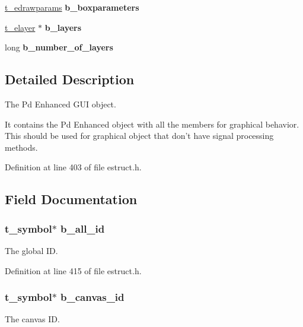 \begin{DoxyCompactItemize}
\item 
\hypertarget{struct__ebox_a01fa53a36dc717c81755d805a868ad9d}{\hyperlink{struct__edrawparams}{t\-\_\-edrawparams} {\bfseries b\-\_\-boxparameters}}\label{struct__ebox_a01fa53a36dc717c81755d805a868ad9d}

\item 
\hypertarget{struct__ebox_ad80949f483467d74761a9e321300d64e}{\hyperlink{struct__elayer}{t\-\_\-elayer} $\ast$ {\bfseries b\-\_\-layers}}\label{struct__ebox_ad80949f483467d74761a9e321300d64e}

\item 
\hypertarget{struct__ebox_a84105957ca11a224cf734f350fb23ac9}{long {\bfseries b\-\_\-number\-\_\-of\-\_\-layers}}\label{struct__ebox_a84105957ca11a224cf734f350fb23ac9}

\end{DoxyCompactItemize}


\subsection{Detailed Description}
The Pd Enhanced G\-U\-I object. 

It contains the Pd Enhanced object with all the members for graphical behavior. This should be used for graphical object that don't have signal processing methods. 

Definition at line 403 of file estruct.\-h.



\subsection{Field Documentation}
\hypertarget{struct__ebox_a0f63dcf604135dd4fbfbf43eaed53c1a}{
\subsubsection[{b\-\_\-all\-\_\-id}]{\setlength{\rightskip}{0pt plus 5cm}t\-\_\-symbol$\ast$ b\-\_\-all\-\_\-id}}\label{struct__ebox_a0f63dcf604135dd4fbfbf43eaed53c1a}
The global I\-D. 

Definition at line 415 of file estruct.\-h.

\hypertarget{struct__ebox_ac0251c6969a1032f8f50d076e909fb3e}{
\subsubsection[{b\-\_\-canvas\-\_\-id}]{\setlength{\rightskip}{0pt plus 5cm}t\-\_\-symbol$\ast$ b\-\_\-canvas\-\_\-id}}\label{struct__ebox_ac0251c6969a1032f8f50d076e909fb3e}
The canvas I\-D. 


